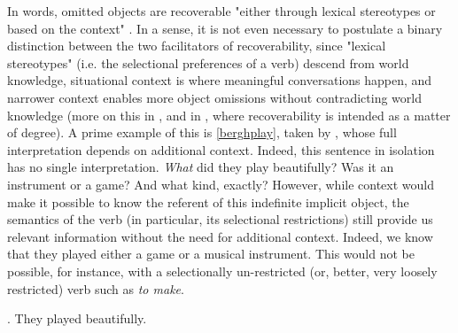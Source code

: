 In  words, omitted objects are recoverable "either through lexical stereotypes or based on the context" \parencite[7]{Kardos2010}. In a sense, it is not even necessary to postulate a binary distinction between the two facilitators of recoverability, since "lexical stereotypes" (i.e. the selectional preferences of a verb) descend from world knowledge, situational context is where meaningful conversations happen, and narrower context enables more object omissions without contradicting world knowledge (more on this in , and in \textcite{Glass2013, Glass2020, glass2022english}, where recoverability is intended as a matter of degree). A prime example of this is \ref{berghplay}, taken by \textcite[24]{BerghOhlander2016}, whose full interpretation depends on additional context. Indeed, this sentence in isolation has no single interpretation. \textit{What} did they play beautifully? Was it an instrument or a game? And what kind, exactly? However, while context would make it possible to know the referent of this indefinite implicit object, the semantics of the verb (in particular, its selectional restrictions) still provide us relevant information without the need for additional context. Indeed, we know that they played either a game or a musical instrument. This would not be possible, for instance, with a selectionally un-restricted (or, better, very loosely restricted) verb such as \textit{to make}.

\ex. \label{berghplay} They played beautifully.

